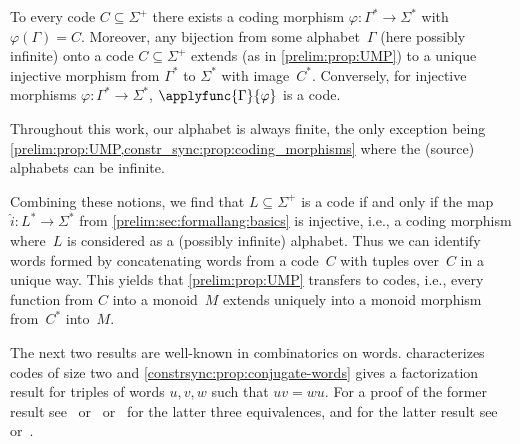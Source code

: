 \begin{proposition}
	\label{constr_sync:prop:coding_morphisms}
	To every code $C \subseteq \Sigma^+$ there exists a coding morphism $\varphi \colon \Gamma^* \to \Sigma^*$ with $\varphi(\Gamma) = C$.  
	Moreover,
	any bijection from some alphabet~$\Gamma$ (here possibly infinite) onto a code $C \subseteq \Sigma^+$ 
	extends (as in \cref{prelim:prop:UMP}) to a unique injective morphism from $\Gamma^*$ to $\Sigma^*$ with image~$C^*$. Conversely, for injective morphisms $\varphi \colon \Gamma^* \to \Sigma^*$, $\applyfunc{\Gamma}{\varphi}$
	is a code.	
\end{proposition}


Throughout this work, our alphabet is always finite,
the only exception being \cref{prelim:prop:UMP,constr_sync:prop:coding_morphisms} 
where the (source) alphabets can be infinite.


\begin{remark}
	Combining these notions, we find that $L \subseteq \Sigma^+$
	is a code if and only if the map $\hat{i} \colon L^* \to \Sigma^*$
	from \cref{prelim:sec:formallang:basics} is injective, i.e.,
	a coding morphism where~$L$ is considered as a (possibly infinite)
	alphabet.
	Thus we can identify words formed by concatenating words from a code~$C$ with tuples
	over~$C$ in a unique way. This yields that \cref{prelim:prop:UMP}
	transfers to codes, i.e., every function from $C$ into a monoid~$M$
	extends uniquely into a monoid morphism from~$C^*$ into~$M$.	
\end{remark}

The next two results are well-known in combinatorics on words. 
characterizes codes of size two and \cref{constrsync:prop:conjugate-words} gives a factorization result for triples of words $u,v,w$
such that $uv = wu$. 
For a proof of the former result see~\cite[Cor.~1.2.6, Prop.~1.3.1 \& 1.3.2]{lothaire_1997}
or~\cite[Lem.~5.1]{Ginsburg1964BOUNDEDAL} or~\cite[Lem.~3 \& Cor.~4.1]{LyndonSchutzenberger1962} for the latter three equivalences,
and for the latter result see~\cite[Prop.~1.3.4]{lothaire_1997}
or~\cite[Lem.~2]{LyndonSchutzenberger1962}.


